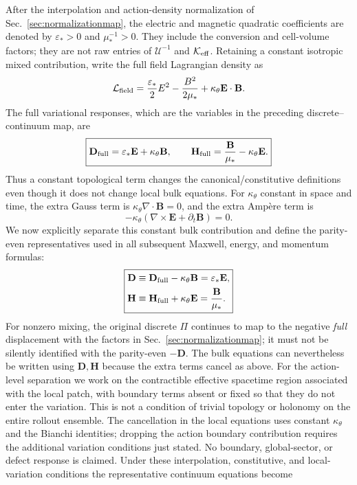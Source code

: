 \documentclass[11pt]{article}
\begin{document}
After the interpolation and action-density normalization of Sec.~\ref{sec:normalizationmap}, the electric and magnetic quadratic coefficients are denoted by $\varepsilon_*>0$ and $\mu_*^{-1}>0$. They include the conversion and cell-volume factors; they are not raw entries of $\mathcal U^{-1}$ and $\mathcal K_{\rm eff}$. Retaining a constant isotropic mixed contribution, write the full field Lagrangian density as
\begin{equation}
\mathcal L_{\rm field}
=\frac{\varepsilon_*}{2}E^2-\frac{B^2}{2\mu_*}
+\kappa_\theta\mathbf E\cdot\mathbf B.
\end{equation}
The full variational responses, which are the variables in the preceding discrete--continuum map, are
\begin{equation}
\boxed{
\mathbf D_{\rm full}=\varepsilon_*\mathbf E+\kappa_\theta\mathbf B,
\qquad
\mathbf H_{\rm full}=\frac{\mathbf B}{\mu_*}-\kappa_\theta\mathbf E.
}
\end{equation}
Thus a constant topological term changes the canonical/constitutive definitions even though it does not change local bulk equations. For $\kappa_\theta$ constant in space and time, the extra Gauss term is $\kappa_\theta\nabla\cdot\mathbf B=0$, and the extra Amp\`ere term is
\begin{equation}
-\kappa_\theta(\nabla\times\mathbf E+\partial_t\mathbf B)=0.
\end{equation}
We now explicitly separate this constant bulk contribution and define the parity-even representatives used in all subsequent Maxwell, energy, and momentum formulas:
\begin{equation}
\boxed{
\begin{aligned}
\mathbf D&\equiv\mathbf D_{\rm full}-\kappa_\theta\mathbf B
=\varepsilon_*\mathbf E,\\
\mathbf H&\equiv\mathbf H_{\rm full}+\kappa_\theta\mathbf E
=\frac{\mathbf B}{\mu_*}.
\end{aligned}
}
\end{equation}
For nonzero mixing, the original discrete $\Pi$ continues to map to the negative \emph{full} displacement with the factors in Sec.~\ref{sec:normalizationmap}; it must not be silently identified with the parity-even $-\mathbf D$. The bulk equations can nevertheless be written using $\mathbf D,\mathbf H$ because the extra terms cancel as above. For the action-level separation we work on the contractible effective spacetime region associated with the local patch, with boundary terms absent or fixed so that they do not enter the variation. This is not a condition of trivial topology or holonomy on the entire rollout ensemble. The cancellation in the local equations uses constant $\kappa_\theta$ and the Bianchi identities; dropping the action boundary contribution requires the additional variation conditions just stated. No boundary, global-sector, or defect response is claimed. Under these interpolation, constitutive, and local-variation conditions the representative continuum equations become
\end{document}
